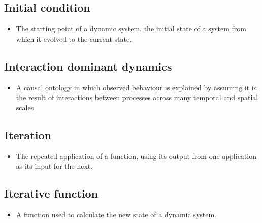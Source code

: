 \documentclass[12pt,]{book}
\providecommand{\tightlist}{%
  \setlength{\itemsep}{0pt}\setlength{\parskip}{0pt}}
\begin{document}
\hypertarget{Init38}{%
\subsection*{\texorpdfstring{\textbf{Initial condition}}{Initial condition}}\label{Init38}}

\begin{itemize}
\tightlist
\item
  The starting point of a dynamic system, the initial state of a system from which it evolved to the current state.
\end{itemize}

\hypertarget{Inte39}{%
\subsection*{\texorpdfstring{\textbf{Interaction dominant dynamics}}{Interaction dominant dynamics}}\label{Inte39}}

\begin{itemize}
\tightlist
\item
  A causal ontology in which observed behaviour is explained by assuming it is the result of interactions between processes across many temporal and spatial scales
\end{itemize}

\hypertarget{Iter40}{%
\subsection*{\texorpdfstring{\textbf{Iteration}}{Iteration}}\label{Iter40}}

\begin{itemize}
\tightlist
\item
  The repeated application of a function, using its output from one application as its input for the next.
\end{itemize}

\hypertarget{Iter41}{%
\subsection*{\texorpdfstring{\textbf{Iterative function}}{Iterative function}}\label{Iter41}}

\begin{itemize}
\tightlist
\item
  A function used to calculate the new state of a dynamic system.
\end{itemize}
\end{document}
